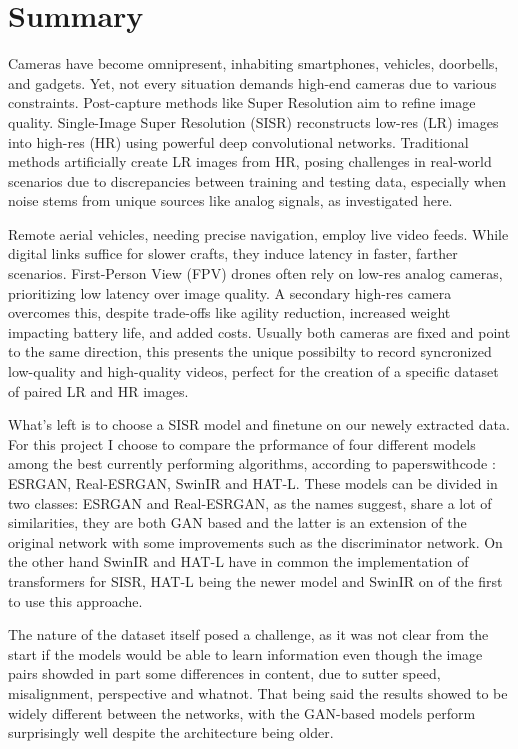 \chapter*{Summary}
\label{summary}

Cameras have become omnipresent, inhabiting smartphones, vehicles, doorbells, and gadgets. Yet, not every situation demands high-end cameras due to various constraints. Post-capture methods like Super Resolution aim to refine image quality. Single-Image Super Resolution (SISR) reconstructs low-res (LR) images into high-res (HR) using powerful deep convolutional networks. Traditional methods artificially create LR images from HR, posing challenges in real-world scenarios due to discrepancies between training and testing data, especially when noise stems from unique sources like analog signals, as investigated here.

Remote aerial vehicles, needing precise navigation, employ live video feeds. While digital links suffice for slower crafts, they induce latency in faster, farther scenarios. First-Person View (FPV) drones often rely on low-res analog cameras, prioritizing low latency over image quality. A secondary high-res camera overcomes this, despite trade-offs like agility reduction, increased weight impacting battery life, and added costs. Usually both cameras are fixed and point to the same direction, this presents the unique possibilty to record syncronized low-quality and high-quality videos, perfect for the creation of a specific dataset of paired LR and HR images.

What's left is to choose a SISR model and finetune on our newely extracted data. For this project I choose to compare the prformance of four different models among the best currently performing algorithms, according to paperswithcode \cite{pwcode}: ESRGAN\cite{wang2018esrgan}, Real-ESRGAN\cite{wang2021realesrgan}, SwinIR\cite{liang2021swinir} and HAT-L\cite{chen2023activating}. These models can be divided in two classes: ESRGAN and Real-ESRGAN, as the names suggest, share a lot of similarities, they are both GAN based and the latter is an extension of the original network with some improvements such as the discriminator network. On the other hand SwinIR and HAT-L have in common the implementation of transformers for SISR, HAT-L being the newer model and SwinIR on of the first to use this approache.

The nature of the dataset itself posed a challenge, as it was not clear from the start if the models would be able to learn information even though the image pairs showded in part some differences in content, due to sutter speed, misalignment, perspective and whatnot. That being said the results showed to be widely different between the networks, with the GAN-based models perform surprisingly well despite the architecture being older.

